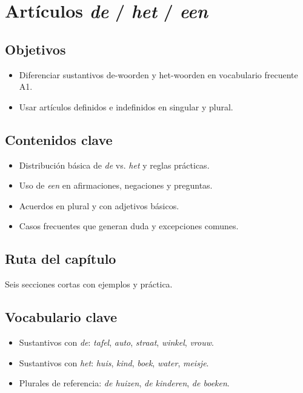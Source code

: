 \chapter{Artículos \textit{de} / \textit{het} / \textit{een}}
\section{Objetivos}
\begin{itemize}[leftmargin=*]
	\item Diferenciar sustantivos de-woorden y het-woorden en vocabulario frecuente A1.
	\item Usar artículos definidos e indefinidos en singular y plural.
\end{itemize}

\section{Contenidos clave}
\begin{itemize}[leftmargin=*]
	\item Distribución básica de \textit{de} vs. \textit{het} y reglas prácticas.
	\item Uso de \textit{een} en afirmaciones, negaciones y preguntas.
	\item Acuerdos en plural y con adjetivos básicos.
	\item Casos frecuentes que generan duda y excepciones comunes.
\end{itemize}

\section{Ruta del capítulo}
Seis secciones cortas con ejemplos y práctica.








\section{Vocabulario clave}
\begin{itemize}[leftmargin=*]
	\item Sustantivos con \textit{de}: \textit{tafel}, \textit{auto}, \textit{straat}, \textit{winkel}, \textit{vrouw}.
	\item Sustantivos con \textit{het}: \textit{huis}, \textit{kind}, \textit{boek}, \textit{water}, \textit{meisje}.
	\item Plurales de referencia: \textit{de huizen}, \textit{de kinderen}, \textit{de boeken}.
\end{itemize}

